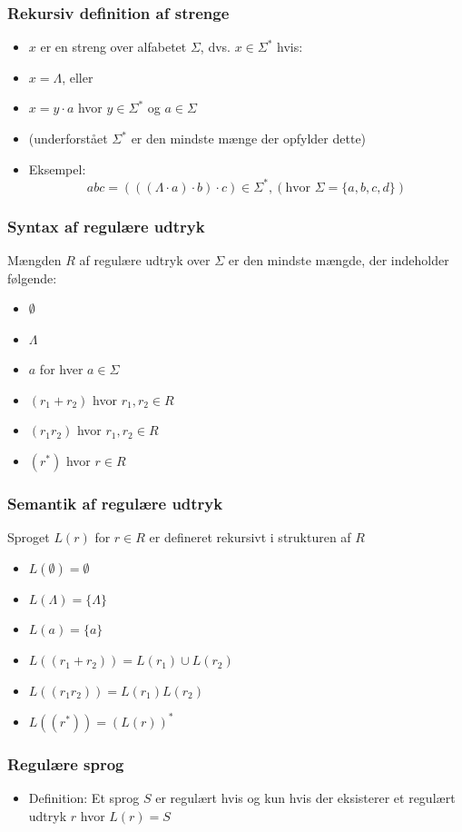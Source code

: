 \documentclass[]{beamer}
\begin{document}
\begin{frame}
\frametitle{Rekursiv definition af strenge}
\begin{itemize}
\item $x$ er en streng over alfabetet $Σ$, dvs. $x∈Σ^*$ hvis:
\item $x=Λ$, eller
\item $x=y·a$ hvor $y∈Σ^*$ og $a∈Σ$
\item (underforstået $Σ^*$ er den mindste mænge der opfylder dette)
\item Eksempel:  
\[abc = (((Λ·a)·b)·c) ∈ Σ^*,   (\text{hvor } Σ=\{a,b,c,d\})\]
\end{itemize}
\end{frame}

\begin{frame}
\frametitle{Syntax af regulære udtryk}
Mængden $R$ af regulære udtryk over $Σ$ er 
den mindste mængde, der indeholder følgende:
\begin{itemize}
\item $∅$ 
\item $Λ$ 
\item $a$ for hver $a∈Σ$
\item $(r_1+r_2)$ hvor $r_1,r_2∈R$
\item $(r_1r_2)$  hvor $r_1,r_2∈R$
\item $(r^*)$  hvor $r∈R$
\end{itemize}
\end{frame}


\begin{frame}
\frametitle{Semantik af regulære udtryk}
Sproget $L(r)$ for $r∈R$ er defineret rekursivt i strukturen af $R$
\begin{itemize}
\item $L(∅) = ∅$ 
\item $L(Λ) = \{ Λ \}$ 
\item $L(a) = \{ a \}$
\item $L((r_1+r_2))= L(r_1)∪L(r_2)$ 
\item $L((r_1r_2))=L(r_1)L(r_2)$  
\item $L((r^*)) = (L(r))^*$
\end{itemize}
\end{frame}

\begin{frame}
\frametitle{Regulære sprog}
\begin{itemize}
\item Definition:
Et sprog $S$ er regulært hvis og kun hvis
der eksisterer et regulært udtryk $r$ hvor $L(r)=S$
\end{itemize}
\end{frame}
\end{document}

